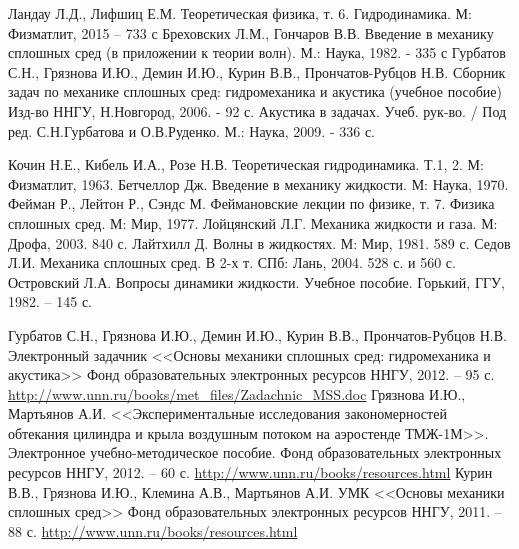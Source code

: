 \documentclass[a5paper,11pt]{extarticle}
\theoremstyle{definition}
\begin{document}
\newpage
\sloppy

% 
% 
% 


\newpage
{}
\printindex

\newpage
{}
\begin{thebibliography}{99}

 Ландау Л.Д., Лифшиц Е.М. Теоретическая физика, т. 6. Гидродинамика. М:  Физматлит, 2015 – 733 с
 Бреховских Л.М., Гончаров В.В. Введение в механику сплошных сред (в приложении к теории волн). М.: Наука, 1982. - 335 с
 Гурбатов С.Н., Грязнова И.Ю., Демин И.Ю., Курин В.В., Прончатов-Рубцов Н.В. Сборник задач по механике сплошных сред: гидромеханика и акустика (учебное пособие) Изд-во ННГУ, Н.Новгород, 2006. - 92 с.
 Акустика в задачах. Учеб. рук-во. / Под ред. С.Н.Гурбатова и О.В.Руденко. М.: Наука, 2009. - 336 с.

 Кочин Н.Е., Кибель И.А., Розе Н.В. Теоретическая гидродинамика. Т.1, 2. М: Физматлит, 1963.
 Бетчеллор Дж. Введение в механику жидкости. М: Наука, 1970. 
 Фейман Р., Лейтон Р., Сэндс М. Феймановские лекции по физике, т. 7. Физика сплошных сред. М: Мир, 1977.
 Лойцянский Л.Г. Механика жидкости и газа. М: Дрофа, 2003. 840 с.
 Лайтхилл Д. Волны в жидкостях. М: Мир, 1981. 589 с.
 Седов Л.И. Механика сплошных сред. В 2-х т. СПб: Лань, 2004. 528 с. и 560 с.
 Островский Л.А. Вопросы динамики жидкости. Учебное пособие. Горький, ГГУ, 1982. – 145 с.

 Гурбатов С.Н., Грязнова И.Ю., Демин И.Ю., Курин В.В., Прончатов-Рубцов Н.В.  Электронный задачник <<Основы механики сплошных сред: гидромеханика и акустика>>  Фонд образовательных электронных ресурсов ННГУ, 2012. – 95 с. \url{http://www.unn.ru/books/met_files/Zadachnic_MSS.doc}
 Грязнова И.Ю., Мартьянов А.И. <<Экспериментальные исследования закономерностей обтекания цилиндра и крыла воздушным потоком на аэростенде ТМЖ-1М>>. Электронное учебно-методическое пособие.  Фонд образовательных электронных ресурсов ННГУ, 2012. – 60 с. \url{http://www.unn.ru/books/resources.html}
 Курин В.В., Грязнова И.Ю., Клемина А.В., Мартьянов А.И. УМК <<Основы механики сплошных сред>> Фонд образовательных электронных ресурсов ННГУ, 2011. – 88 с. \url{http://www.unn.ru/books/resources.html}




\end{thebibliography}
\end{document}
